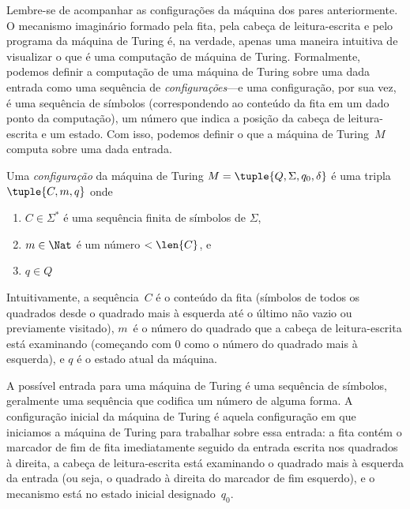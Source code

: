 \documentclass[../../../include/open-logic-section]{subfiles}
\begin{document}

\begin{explain}
Lembre-se de acompanhar as configurações da máquina dos pares
anteriormente. O mecanismo imaginário formado pela fita, pela cabeça de
leitura-escrita e pelo programa da máquina de Turing é, na verdade, apenas
uma maneira intuitiva de visualizar o que é uma computação de máquina de
Turing. Formalmente, podemos definir a computação de uma máquina de Turing
sobre uma dada entrada como uma sequência de
\emph{configurações}---e uma configuração, por sua vez, é uma sequência de
símbolos (correspondendo ao conteúdo da fita em um dado ponto da
computação), um número que indica a posição da cabeça de leitura-escrita
e um estado. Com isso, podemos definir o que a máquina de
Turing~$M$ computa sobre uma dada entrada.
\end{explain}

\begin{defn}[Configuração]
Uma \emph{configuração} da máquina de Turing $M = \tuple{Q, \Sigma, q_0,
\delta}$ é uma tripla $\tuple{C, m, q}$ onde
\begin{enumerate}
\item $C \in \Sigma^*$ é uma sequência finita de símbolos de $\Sigma$,
\item $m \in \Nat$ é um número $< \len{C}$, e
\item $q \in Q$
\end{enumerate}
Intuitivamente, a sequência~$C$ é o conteúdo da fita (símbolos de
todos os quadrados desde o quadrado mais à esquerda até o último não
vazio ou previamente visitado), $m$~é o número do quadrado que a
cabeça de leitura-escrita está examinando (começando com $0$ como o número do
quadrado mais à esquerda), e $q$ é o estado atual da máquina.
\end{defn}

\begin{explain}
A possível entrada para uma máquina de Turing é uma sequência de símbolos,
geralmente uma sequência que codifica um número de alguma forma. A
configuração inicial da máquina de Turing é aquela configuração em que
iniciamos a máquina de Turing para trabalhar sobre essa entrada: a fita contém o
marcador de fim de fita imediatamente seguido da entrada escrita nos
quadrados à direita, a cabeça de leitura-escrita está examinando o quadrado
mais à esquerda da entrada (ou seja, o quadrado à direita do marcador de
fim esquerdo), e o mecanismo está no estado inicial designado~$q_0$.
\end{explain}
\end{document}
